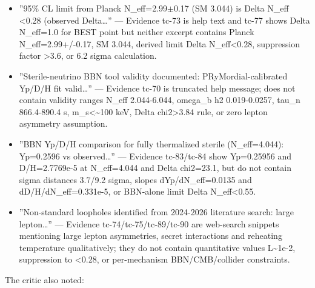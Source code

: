 \documentclass[11pt,a4paper]{article}
\begin{document}
\begin{itemize}
  \item ''95\% CL limit from Planck N\_eff=2.99$\pm$0.17 (SM 3.044) is Delta N\_eff \textless{}0.28 (observed Delta\ldots{}'' --- Evidence tc-73 is help text and tc-77 shows Delta N\_eff=1.0 for BEST point but neither excerpt contains Planck N\_eff=2.99+/-0.17, SM 3.044, derived limit Delta N\_eff\textless{}0.28, suppression factor \textgreater{}3.6, or 6.2 sigma calculation.
  \item ''Sterile-neutrino BBN tool validity documented: PRyMordial-calibrated Yp/D/H fit valid\ldots{}'' --- Evidence tc-70 is truncated help message; does not contain validity ranges N\_eff 2.044-6.044, omega\_b h2 0.019-0.0257, tau\_n 866.4-890.4 s, m\_s\textless{}\textasciitilde{}100 keV, Delta chi2\textgreater{}3.84 rule, or zero lepton asymmetry assumption.
  \item ''BBN Yp/D/H comparison for fully thermalized sterile (N\_eff=4.044): Yp=0.2596 vs observed\ldots{}'' --- Evidence tc-83/tc-84 show Yp=0.25956 and D/H=2.7769e-5 at N\_eff=4.044 and Delta chi2=23.1, but do not contain sigma distances 3.7/9.2 sigma, slopes dYp/dN\_eff=0.0135 and dD/H/dN\_eff=0.331e-5, or BBN-alone limit Delta N\_eff\textless{}0.55.
  \item ''Non-standard loopholes identified from 2024-2026 literature search: large lepton\ldots{}'' --- Evidence tc-74/tc-75/tc-89/tc-90 are web-search snippets mentioning large lepton asymmetries, secret interactions and reheating temperature qualitatively; they do not contain quantitative values L\textasciitilde{}1e-2, suppression to \textless{}0.28, or per-mechanism BBN/CMB/collider constraints.
\end{itemize}
The critic also noted:
\end{document}
